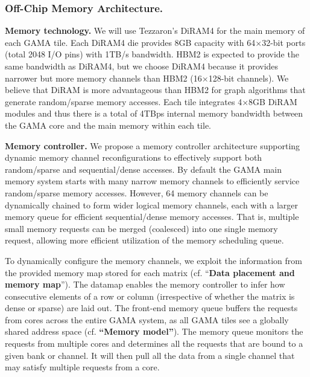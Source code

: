 \subsubsection{Off-Chip Memory Architecture.} 
\label{sec:memory:off-chip}
\noindent
\textbf{Memory technology.} 
We will use  Tezzaron's DiRAM4 for the main memory of each GAMA tile.  
Each DiRAM4 die provides 8GB capacity with 64$\times$32-bit ports (total 2048 I/O pins) with 1TB/s bandwidth. 
HBM2 is expected to provide the same bandwidth as DiRAM4, but we choose DiRAM4 because it provides narrower but more memory channels than HBM2 (16$\times$128-bit channels). 
We believe that DiRAM is more advantageous than HBM2 for graph algorithms that generate random/sparse memory accesses. 
Each tile integrates 4$\times$8GB DiRAM modules and thus there is a total of 4TBps internal memory bandwidth between the GAMA core and the main memory within each tile. 


\vspace{3pt}
\noindent
\textbf{Memory controller.} 
We propose a memory controller architecture supporting dynamic memory channel reconfigurations to effectively support both random/sparse and sequential/dense accesses.
By default the GAMA main memory system starts with many narrow memory channels to efficiently service random/sparse memory accesses.
However, %
64 memory channels can be dynamically chained to form wider logical memory channels, each with a larger memory queue for efficient sequential/dense memory accesses.
That is, multiple small memory requests can be merged (coalesced) into one single memory request, allowing more efficient utilization of the memory scheduling queue.


To dynamically configure the memory channels, we exploit the information from the provided memory map stored for each matrix (cf. ``\textbf{Data placement and memory map}'').
The datamap enables the memory controller to infer how consecutive elements of a row or column (irrespective of whether the matrix is dense or sparse) are laid out. 
The front-end memory queue buffers the requests from cores across the entire GAMA system, as all GAMA tiles see a globally shared address space (cf. \textbf{``Memory model''}). 
The memory queue monitors the requests from multiple cores and determines all the requests that are bound to a given bank or channel. 
It will then pull all the data from a single channel that may satisfy multiple requests from a core.  


